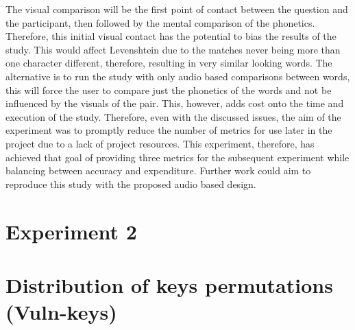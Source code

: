 The visual comparison will be the first point of contact between the question and the participant, then followed by the mental comparison of the phonetics. Therefore, this initial visual contact has the potential to bias the results of the study. This would affect Levenshtein due to the matches never being more than one character different, therefore, resulting in very similar looking words.
The alternative is to run the study with only audio based comparisons between words, this will force the user to compare just the phonetics of the words and not be influenced by the visuals of the pair. This, however, adds cost onto the time and execution of the study. Therefore, even with the discussed issues, the aim of the experiment was to promptly reduce the number of metrics for use later in the project due to a lack of project resources. This experiment, therefore, has achieved that goal of providing three metrics for the subsequent experiment while balancing between accuracy and expenditure. Further work could aim to reproduce this study with the proposed audio based design.








\section{Experiment 2}

\section{Distribution of keys permutations (Vuln-keys)}